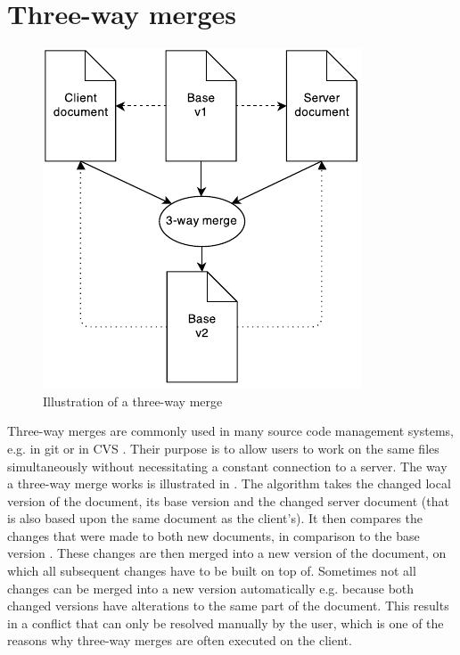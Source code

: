 \section{Three-way merges}
\label{sync-3waymerges}

\begin{figure}[htb]
  \centerline{\includegraphics[width=0.55\linewidth]{images/Three-way_merge.pdf}}
  \caption[Illustration of a three-way merge - based upon
  \protect{}
  \protect{}]{Illustration of a three-way merge}
  \label{fig:Threewaymerge}
\end{figure}

Three-way merges are commonly used in many source code management systems, e.g. in git \cite[p. 52]{scott2009pro} or in CVS \cite[p. 31f]{lindholm2001athreeway}. Their purpose is to allow users to work on the same files simultaneously without necessitating a constant connection to a server. The way a three-way merge works is illustrated in . The algorithm takes the changed local version of the document, its base version and the changed server document (that is also based upon the same document as the client's). It then compares the changes that were made to both new documents, in comparison to the base version \cite[p. 2f]{mens2002softwaremerging}. These changes are then merged into a new version of the document, on which all subsequent changes have to be built on top of. Sometimes not all changes can be merged into a new version automatically e.g. because both changed versions have alterations to the same part of the document. This results in a conflict that can only be resolved manually by the user, which is one of the reasons why three-way merges are often executed on the client.


